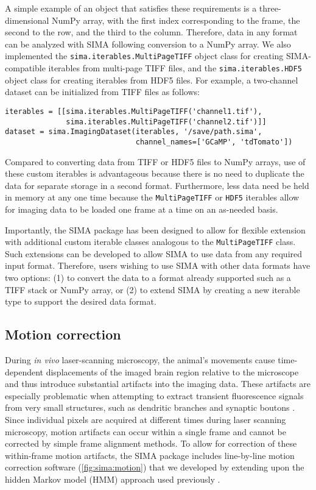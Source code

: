A simple example of an object that satisfies these requirements is a three-dimensional NumPy array,
with the first index corresponding to the frame, the second to the row, and the third to the column. 
Therefore, data in any format can be analyzed with SIMA following conversion
to a NumPy array.
We also implemented the \verb|sima.iterables.MultiPageTIFF| object class
for creating SIMA-compatible iterables from multi-page TIFF files,
and the \verb|sima.iterables.HDF5| object class for creating iterables from HDF5 files.
For example, a two-channel dataset can be initialized from TIFF files as follows:
\begin{verbatim}
iterables = [[sima.iterables.MultiPageTIFF('channel1.tif'),
              sima.iterables.MultiPageTIFF('channel2.tif')]]
dataset = sima.ImagingDataset(iterables, '/save/path.sima',
                              channel_names=['GCaMP', 'tdTomato'])
\end{verbatim}
Compared to converting data from TIFF or HDF5 files to NumPy arrays,
use of these custom iterables is advantageous because there is no need to
duplicate the data for separate storage in a second format.
Furthermore, less data need be held in memory at any one time because the
\verb|MultiPageTIFF| or  \verb|HDF5| iterables allow for imaging data
to be loaded one frame at a time on an as-needed basis.

Importantly, the SIMA package has been designed to allow for flexible extension
with additional custom iterable classes analogous to the \verb|MultiPageTIFF| class.
Such extensions can be developed to allow SIMA to use data from any required
input format.
Therefore, users wishing to use SIMA with other data formats have two options:
(1) to convert the data to a format already supported such as a TIFF stack or NumPy array,
or (2) to extend SIMA by creating a new iterable type to support the desired
data format.

\subsection{Motion correction}
During \textit{in vivo} laser-scanning microscopy, the animal's movements cause 
time-dependent displacements of the imaged brain region relative to the microscope and 
thus introduce substantial artifacts into the imaging data.
These artifacts are especially problematic when attempting to extract transient fluorescence 
signals from very small structures, such as dendritic branches and synaptic boutons \citep[e.g.][]{Kaifosh2013}.
Since individual pixels are acquired at different times during laser scanning microscopy,
motion artifacts can occur within a single frame and cannot be corrected by simple frame 
alignment methods.
To allow for correction of these within-frame motion artifacts, 
the SIMA package includes line-by-line motion correction software (\autoref{fig:sima:motion})
that we developed \citep{Kaifosh2013}
by extending upon the hidden Markov model (HMM) approach used previously \citep{Dombeck2007}.


